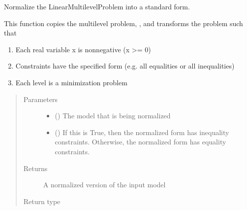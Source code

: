\documentclass[letterpaper,10pt,english]{sphinxmanual}
\begin{document}
\begin{fulllineitems}
\label{\detokenize{reference/mpr:pao.mpr.convert_repn.convert_to_standard_form}}
Normalize the LinearMultilevelProblem into a standard form.

This function copies the multilevel problem, , and transforms
the problem such that
\begin{enumerate}
%
\item {} 
Each real variable x is nonnegative (x \textgreater{}= 0)

\item {} 
Constraints have the specified form (e.g. all equalities or all inequalities)

\item {} 
Each level is a minimization problem

\end{enumerate}
\begin{quote}\begin{description}
\item[{Parameters}] \leavevmode\begin{itemize}
\item {} 
 ({\hyperref[\detokenize{reference/mpr:pao.mpr.repn.LinearMultilevelProblem}]{}}) \textendash{} The model that is being normalized

\item {} 
 (\sphinxstyleliteralemphasis{\sphinxupquote{, }}) \textendash{} If this is True, then the normalized form has inequality constraints.  Otherwise, the normalized
form has equality constraints.

\end{itemize}

\item[{Returns}] \leavevmode
A normalized version of the input model

\item[{Return type}] \leavevmode
{\hyperref[\detokenize{reference/mpr:pao.mpr.repn.LinearMultilevelProblem}]{}}

\end{description}\end{quote}

\end{fulllineitems}
\end{document}
